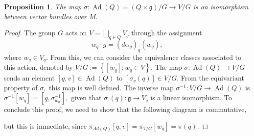 \documentclass[12pt, letterpaper, reqno]{amsart}
\theoremstyle{definition}
\theoremstyle{plain}
\newtheorem{prop}{Proposition}
\theoremstyle{remark}
\begin{document}
\begin{prop}\label{prop:isomorphism_vb}
	The map $ \sigma: \operatorname{Ad} (Q) = (Q\times \mathfrak{g})/G \rightarrow V/G $ is an isomorphism between vector bundles over $ M. $ 
\end{prop}
\begin{proof}
	The group $ G $ acts on $ V = \bigsqcup_{q\in Q}V_q $ through the assignment $$ w_q\cdot g = (d\alpha_g)_q(w_q), $$ 
	where $ w_q\in V_q. $ From this, we can consider the equivalence classes associated to this action, denoted by $ V/G:= \left\{ [w_q]: w_q\in V \right\}.  $ The map $ \sigma: \operatorname{Ad} (Q) \rightarrow V/G $ sends an element $ [q,v]\in \operatorname{Ad} (Q) $ to $ [\sigma_v(q)]\in V/G. $ From the equivariant property of $ \sigma, $ this map is well defined. The inverse map $ \sigma^{-1} : V/G \rightarrow \operatorname{Ad}(Q) $ is $ \sigma^{-1}[w_q] = [q,\sigma^{-1}_{w_q}], $ given that $ \sigma_\cdot(q): \mathfrak{g}\rightarrow V_q $ is a linear isomorphism. To conclude this proof, we need to show that the following diagram is commutative,
	\begin{center}
	\end{center}
	but this is immediate, since $ \pi_{Ad(Q)}[q,v]=\pi_{V/G}[w_q]=\pi(q). $ 
\end{proof}
\end{document}
